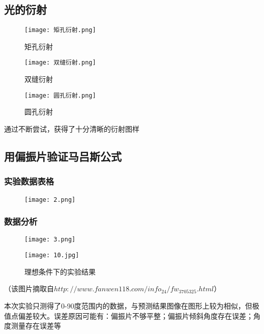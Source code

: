 \documentclass[11pt,a4paper]{article}
\begin{document}
\subsection{光的衍射}
\begin{figure}[H]
    \centering
    \texttt{[image: 矩孔衍射.png]}
    \caption{矩孔衍射}
\end{figure}
\begin{figure}[H]
    \centering
    \texttt{[image: 双缝衍射.png]}
    \caption{双缝衍射}
\end{figure}
\begin{figure}[H]
    \centering
    \texttt{[image: 圆孔衍射.png]}
    \caption{圆孔衍射}
\end{figure}
通过不断尝试，获得了十分清晰的衍射图样
\subsection{用偏振片验证马吕斯公式}
\subsubsection{实验数据表格}
\begin{figure}[H]
    \centering
    \texttt{[image: 2.png]}    
\end{figure}
\subsubsection{数据分析}
\begin{figure}[H]
    \centering
    \texttt{[image: 3.png]}
\end{figure}
\begin{figure}[H]
    \centering
    \texttt{[image: 10.jpg]}
    \caption{理想条件下的实验结果}
\end{figure}
（该图片摘取自$http://www.fanwen118.com/info_24/fw_3705325.html$）

本次实验只测得了0-90度范围内的数据，与预测结果图像在图形上较为相似，但极值点偏差较大。误差原因可能有：偏振片不够平整；偏振片倾斜角度存在误差；角度测量存在误差等
\end{document}
